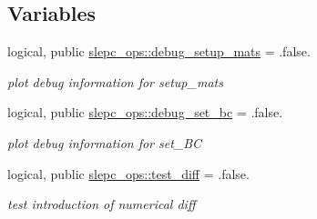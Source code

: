 \subsection*{Variables}
\begin{DoxyCompactItemize}
\item 
logical, public \hyperlink{namespaceslepc__ops_aff5aa0d485bc34e2f6e320172fcc4ccb}{slepc\+\_\+ops\+::debug\+\_\+setup\+\_\+mats} = .false.
\begin{DoxyCompactList}\small\item\em plot debug information for setup\+\_\+mats \end{DoxyCompactList}\item 
logical, public \hyperlink{namespaceslepc__ops_ad57b5fd70608c1b97454963bdd1c4f5b}{slepc\+\_\+ops\+::debug\+\_\+set\+\_\+bc} = .false.
\begin{DoxyCompactList}\small\item\em plot debug information for set\+\_\+\+BC \end{DoxyCompactList}\item 
logical, public \hyperlink{namespaceslepc__ops_a57d0ef4131e939894b34bb07e30e631b}{slepc\+\_\+ops\+::test\+\_\+diff} = .false.
\begin{DoxyCompactList}\small\item\em test introduction of numerical diff \end{DoxyCompactList}\end{DoxyCompactItemize}
